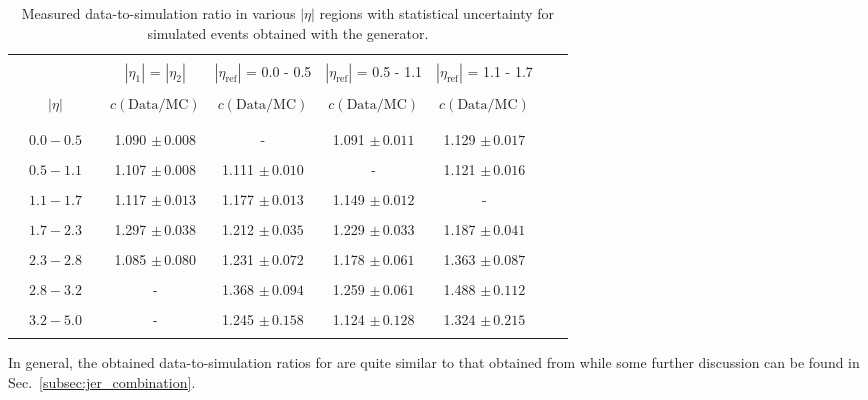 \begin{table}[!htp]
\centering
\caption{Measured data-to-simulation ratio in various $|\eta|$ regions with statistical uncertainty for simulated events obtained with the \herwig generator.}
\label{tab:result_herwig}
\begin{tabular}{ccccccccc}
\hline
  & & & & & & & &\\
 & & & $|\eta_{1}|$ = $|\eta_{2}|$ & $|\eta_\mathrm{ref}|$ = 0.0 - 0.5 & $|\eta_\mathrm{ref}|$ = 0.5 - 1.1 & $|\eta_\mathrm{ref}|$ = 1.1 - 1.7 & &\\
 & & & & & & & &\\	
 & $|\eta|$ & & $c\mathrm{(Data/MC)}$ & $c\mathrm{(Data/MC)}$ & $c\mathrm{(Data/MC)}$ & $c\mathrm{(Data/MC)}$ & \\
& & & & & & & &\\
\hline
 & & & & & & & &\\
 & $0.0 - 0.5$ & & 1.090 $\pm \, 0.008$ & -                    &  1.091 $\pm \, 0.011$ & 1.129 $\pm \, 0.017$ & \\
 & & & & & & & &\\
 & $0.5 - 1.1$ & & 1.107 $\pm \, 0.008$ & 1.111 $\pm \, 0.010$ & -                     & 1.121 $\pm \, 0.016$ & \\
 & & & & & & & &\\
 & $1.1 - 1.7$ & & 1.117 $\pm \, 0.013$ & 1.177 $\pm \, 0.013$ & 1.149 $\pm \, 0.012$  & -                    & \\
 & & & & & & & &\\
 & $1.7 - 2.3$ & & 1.297 $\pm \, 0.038$ & 1.212 $\pm \, 0.035$ & 1.229 $\pm \, 0.033$  & 1.187 $\pm \, 0.041$ & \\
 & & & & & & & &\\
 & $2.3 - 2.8$ & & 1.085 $\pm \, 0.080$ & 1.231 $\pm \, 0.072$ & 1.178 $\pm \, 0.061$  & 1.363 $\pm \, 0.087$ & \\
 & & & & & & & &\\
 & $2.8 - 3.2$ & & -                    & 1.368 $\pm \, 0.094$ & 1.259 $\pm \, 0.061$  & 1.488 $\pm \, 0.112$ & \\
 & & & & & & & &\\
 & $3.2 - 5.0$ & & -                    & 1.245 $\pm \, 0.158$ & 1.124 $\pm \, 0.128$  & 1.324 $\pm \, 0.215$ & \\
 & & & & & & & &\\
\hline
\end{tabular}%
\end{table} 
In general, the obtained data-to-simulation ratios for \herwig are quite similar to that obtained from \pythia while some further discussion can be found in Sec.~\ref{subsec:jer_combination}.

